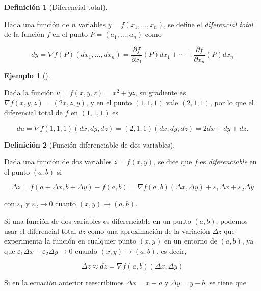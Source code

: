 \documentclass[
  a4paper,
]{scrreport}
\theoremstyle{definition}
\theoremstyle{definition}
\newtheorem{example}{Ejemplo}[chapter]
\theoremstyle{definition}
\newtheorem{definition}{Definición}[chapter]
\theoremstyle{plain}
\theoremstyle{plain}
\theoremstyle{plain}
\theoremstyle{remark}
\begin{document}
\begin{definition}[Diferencial
total]\protect\hypertarget{def-diferencial-total}{}\label{def-diferencial-total}

Dada una función de \(n\) variables \(y=f(x_1,\ldots,x_n)\), se define
el \emph{diferencial total} de la función \(f\) en el punto
\(P=(a_1, \ldots, a_n)\) como

\[
dy 
= \nabla f(P)(dx_1, \ldots, dx_n) 
= \frac{\partial f}{\partial x_1}(P)dx_1 + \cdots + \frac{\partial f}{\partial x_n}(P)dx_n
\]

\end{definition}

\begin{example}[]\protect\hypertarget{exm-diferencial-total}{}\label{exm-diferencial-total}

Dada la función \(u=f(x,y,z) = x^2+yz\), su gradiente es
\(\nabla f(x,y,z) = (2x, z, y)\), y en el punto \((1, 1, 1)\) vale
\((2, 1, 1)\), por lo que el diferencial total de \(f\) en \((1, 1, 1)\)
es

\[
du 
= \nabla f(1, 1, 1)(dx, dy, dz) 
= (2, 1, 1)(dx, dy, dz) 
= 2dx + dy + dz.
\]

\end{example}

\begin{definition}[Función diferenciable de dos
variables]\protect\hypertarget{def-funcion-2-variables-diferenciable}{}\label{def-funcion-2-variables-diferenciable}

Dada una función de dos variables \(z=f(x,y)\), se dice que \(f\) es
\emph{diferenciable} en el punto \((a,b)\) si

\[
\Delta z = f(a+\Delta x, b+\Delta y) - f(a,b) = \nabla f(a, b) (\Delta x, \Delta y) + \varepsilon_1 \Delta x + \varepsilon_2 \Delta y
\]

con \(\varepsilon_1\) y \(\varepsilon_2 \to 0\) cuanto
\((x,y)\to (a,b)\).

\end{definition}

Si una función de dos variables es diferenciable en un punto \((a,b)\),
podemos usar el diferencial total \(dz\) como una aproximación de la
variación \(\Delta z\) que experimenta la función en cualquier punto
\((x,y)\) en un entorno de \((a,b)\), ya que
\(\varepsilon_1 \Delta x + \varepsilon_2 \Delta y \to 0\) cuando
\((x,y)\to (a,b)\), es decir,

\[
\Delta z \approx dz = \nabla f(a, b) (\Delta x, \Delta y)
\]

Si en la ecuación anterior reescribimos \(\Delta x = x-a\) y
\(\Delta y = y-b\), se tiene que
\end{document}
